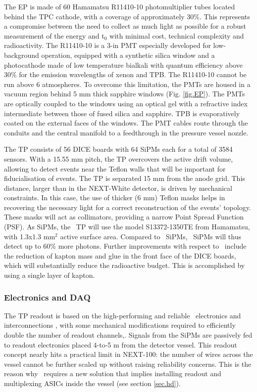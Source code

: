 \indent

The EP is made of 60 Hamamatsu R11410-10 photomultiplier tubes located behind the TPC cathode, with a coverage of approximately 30\%. This represents a compromise between the need to collect as much light as possible for a robust measurement of the energy and t$_0$ with minimal cost, technical complexity and radioactivity. The R11410-10 is a 3-in PMT especially developed for low-background operation, equipped with a synthetic silica window and a photocathode made of low temperature bialkali with quantum efficiency above 30\% for the emission wavelengths of xenon and TPB.
The R11410-10 cannot be run above 6 atmospheres. To overcome this limitation, the PMTs are housed in a vacuum region behind 5 mm thick sapphire windows (Fig. \ref{fig.EP}). The PMTs are optically coupled to the windows using an optical gel with a refractive index intermediate between those of fused silica and sapphire. TPB is evaporatively coated on the external faces of the windows. 
The PMT cables route through the conduits and the central manifold to a feedthrough in the pressure vessel nozzle.  

\indent

The TP consists of 56 DICE boards with 64 SiPMs each for a total of 3584 sensors. With a 15.55 mm pitch, the TP overcovers the active drift volume, allowing to detect events near the Teflon walls that will be important for fiducialisation of events.
The TP is separated 15 mm from the anode grid. This distance, larger than in the NEXT-White detector, is driven by mechanical constraints. In this case, the use of thicker (6 mm) Teflon masks helps in recovering the necessary light for a correct reconstruction of the events’ topology. These masks will act as collimators, providing a narrow Point Spread Function (PSF). As SiPMs, the \Next\ TP will use the model S13372-1350TE from Hamamatsu, with 1.3x1.3 mm$^2$ active surface area. Compared to \New\ SiPMs, \Next\ SiPMs will thus detect up to 60\% more photons.
Further improvements with respect to \NEW\ include the reduction of kapton mass and glue in the front face of the DICE boards, which will substantially reduce the radioactive budget. This is accomplished by using a single layer of kapton.

\subsubsection{Electronics and DAQ}

The TP readout is based on the high-performing and reliable \NEW\ electronics and interconnections \cite{Rodriguez:2015a}, with some mechanical modifications required to efficiently double the number of readout channels,. Signals from the SiPMs are passively fed to readout electronics placed 4-to-5 m from the detector vessel. This readout concept nearly hits a practical limit in NEXT-100: the number of wires across the vessel cannot be further scaled up without raising reliability concerns. This is the reason why \NHD\  requires a new solution that implies installing readout and multiplexing ASICs inside the vessel (see section \ref{sec.hd}). %

